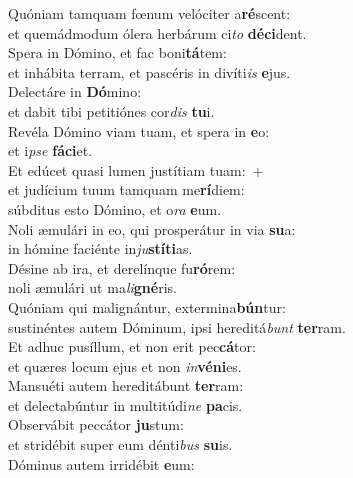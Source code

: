 \evenverse Quóniam tamquam fœnum velóciter a\textbf{ré}scent:~\*\\
\evenverse et quemádmodum ólera herbárum ci\textit{to} \textbf{dé}\textbf{ci}dent.\\
\oddverse Spera in Dómino, et fac boni\textbf{tá}tem:~\*\\
\oddverse et inhábita terram, et pascéris in divíti\textit{is} \textbf{e}jus.\\
\evenverse Delectáre in \textbf{Dó}mino:~\*\\
\evenverse et dabit tibi petitiónes cor\textit{dis} \textbf{tu}i.\\
\oddverse Revéla Dómino viam tuam, et spera in \textbf{e}o:~\*\\
\oddverse et i\textit{pse} \textbf{fá}\textbf{ci}et.\\
\evenverse Et edúcet quasi lumen justítiam tuam:~+\\
\evenverse  et judícium tuum tamquam me\textbf{rí}diem:~\*\\
\evenverse súbditus esto Dómino, et o\textit{ra} \textbf{e}um.\\
\oddverse Noli æmulári in eo, qui prosperátur in via \textbf{su}a:~\*\\
\oddverse in hómine faciénte in\textit{ju}\textbf{stí}\textbf{ti}as.\\
\evenverse Désine ab ira, et derelínque fu\textbf{ró}rem:~\*\\
\evenverse noli æmulári ut ma\textit{li}\textbf{gné}ris.\\
\oddverse Quóniam qui malignántur, extermina\textbf{bún}tur:~\*\\
\oddverse sustinéntes autem Dóminum, ipsi hereditá\textit{bunt} \textbf{ter}ram.\\
\evenverse Et adhuc pusíllum, et non erit pec\textbf{cá}tor:~\*\\
\evenverse et quæres locum ejus et non \textit{in}\textbf{vé}\textbf{ni}es.\\
\oddverse Mansuéti autem hereditábunt \textbf{ter}ram:~\*\\
\oddverse et delectabúntur in multitúdi\textit{ne} \textbf{pa}cis.\\
\evenverse Observábit peccátor \textbf{ju}stum:~\*\\
\evenverse et stridébit super eum dénti\textit{bus} \textbf{su}is.\\
\oddverse Dóminus autem irridébit \textbf{e}um:~\*\\
